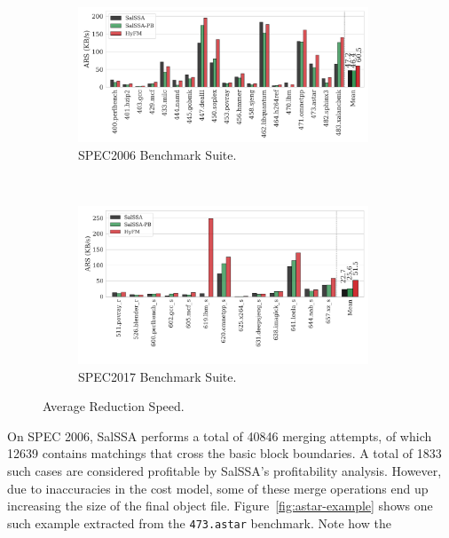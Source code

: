   
\begin{figure}[h]
  \centering
  \begin{subfigure}{\textwidth}
    \centering
    \includegraphics[width=0.95\textwidth]{src/fastfm/figs/ars-spec2006.pdf}
    \caption{SPEC2006 Benchmark Suite.}
    \label{fig:ars-spec2006}
  \end{subfigure}
  \\
  \begin{subfigure}{\textwidth}
  \centering
    \includegraphics[width=0.95\textwidth]{src/fastfm/figs/ars-spec2017.pdf}
    \caption{SPEC2017 Benchmark Suite.}
    \label{fig:ars-spec2017}
  \end{subfigure}
  \caption{Average Reduction Speed.}
  \label{fig:average-reduction-speed}
\end{figure}


On SPEC 2006, SalSSA performs a total of 40846 merging attempts, of which 12639 contains matchings that cross the basic block boundaries.
A total of 1833 such cases are considered profitable by SalSSA's profitability analysis.
However, due to inaccuracies in the cost model, some of these merge operations end up increasing the size of the final object file.
Figure~\ref{fig:astar-example} shows one such example extracted from the \texttt{473.astar} benchmark.
Note how the 

